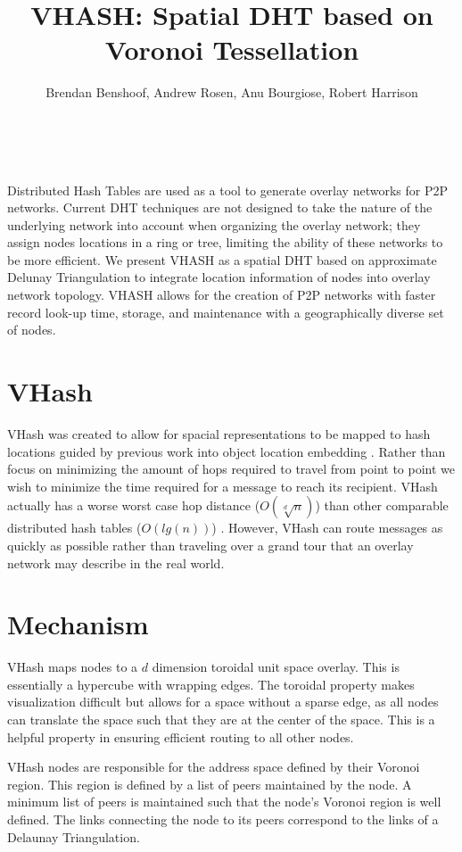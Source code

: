 \documentclass[11pt]{IEEETran} %
\title{VHASH: Spatial DHT based on Voronoi Tessellation}
\author{Brendan Benshoof, Andrew Rosen, Anu Bourgiose, Robert Harrison}
\author{\IEEEauthorblockN{Brendan Benshoof,
Andrew Rosen\, Anu Bourgeois and Robert Harrison}\\
\IEEEauthorblockA{Department of Computer Science, \\ Georgia State University, Atlanta, Georgia}
}
\begin{document}
\maketitle

Distributed Hash Tables are used as a tool to generate overlay networks for P2P networks. Current DHT techniques are not designed to take the nature of the underlying network into account when organizing the overlay network; they assign nodes locations in a ring or tree, limiting the ability of these networks to be more efficient. We present VHASH as a spatial DHT based on approximate Delunay Triangulation to integrate location information of nodes into overlay network topology. VHASH allows for the creation of P2P networks with faster record look-up time, storage, and maintenance with a geographically diverse set of nodes.

\section{VHash}

VHash was created to allow for spacial representations to be mapped to hash locations guided by previous work into object location embedding \cite{voronet}. Rather than focus on minimizing the amount of hops required to travel from point to point we wish to minimize the time required for a message to reach its recipient. VHash actually has a worse worst case hop distance ($O(\sqrt[d]{n})$) than other comparable distributed hash tables ($O(lg(n))$) \cite{chord}. However, VHash can route messages as quickly as possible rather than traveling over a grand tour that an overlay network may describe in the real world.


\section{Mechanism}
VHash maps nodes to a $d$ dimension toroidal unit space overlay. This is essentially a hypercube with wrapping edges. The toroidal property makes visualization difficult but allows for a space without a sparse edge, as all nodes can translate the space such that they are at the center of the space.  This is a helpful property in ensuring efficient routing to all other nodes.

VHash nodes are responsible for the address space defined by their Voronoi region. This region is defined by a list of peers maintained by the node. A minimum list of peers is maintained such that the node's Voronoi region is well defined. The links connecting the node to its peers correspond to the links of a Delaunay Triangulation.
\end{document}
